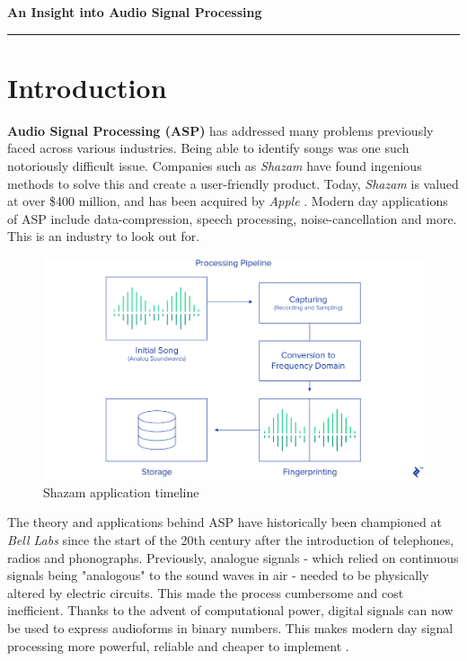 \documentclass[a4paper,12pt]{article}
\begin{document}
\begin{center}
\Large
\textbf{An Insight into Audio Signal Processing}
\end{center}

\begin{center}\rule{0.9\linewidth}{0.5pt}\end{center}

\normalsize
\section{Introduction}
\textbf{Audio Signal Processing (ASP)} has addressed many problems previously faced across various industries. Being able to identify songs was one such notoriously difficult issue.
Companies such as \textit{Shazam} have found ingenious methods to solve this and create a user-friendly product. Today, \textit{Shazam} is valued at over \$400 million,
and has been acquired by \textit{Apple} \parencite{BBCvaluation}. Modern day applications of ASP include data-compression, speech processing, noise-cancellation and more.
This is an industry to look out for.

\begin{figure}[h!]
    \includegraphics[width=16cm]{shazamdemo.png}
    \centering
    \caption{Shazam application timeline \parencite{ShazamASP}}
    \end{figure}

The theory and applications behind ASP have historically been championed at \textit{Bell Labs}
since the start of the 20th century after the introduction of telephones, radios and phonographs. 
Previously, analogue signals - which relied on continuous signals being "analogous" to the sound waves in air - needed to be
physically altered by electric circuits. This made the process cumbersome and cost inefficient. Thanks to the advent of computational power, digital signals can now be used to express
audioforms in binary numbers. This makes modern day signal processing more powerful, reliable and cheaper to implement \parencite{Udo1997}.
\newline
\end{document}
